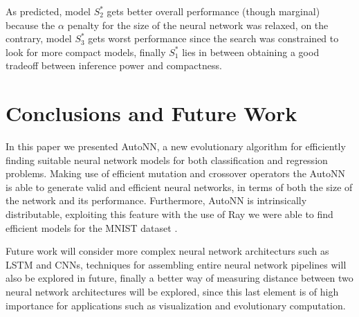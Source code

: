 \documentclass[journal]{IEEEtran}
\begin{document}
As predicted, model $S^*_2$ gets better overall performance (though marginal) because the $\alpha$ penalty for the size of the neural network was relaxed, on the contrary, model $S^*_3$ gets worst performance since the search was constrained to look for more compact models, finally $S^*_1$ lies in between obtaining a good tradeoff between inference power and compactness.

\section{Conclusions and Future Work}
\label{sec:conclusions}

In this paper we presented AutoNN, a new evolutionary algorithm for efficiently finding suitable neural network models for both classification and regression problems. Making use of efficient mutation and crossover operators the AutoNN is able to generate valid and efficient neural networks, in terms of both the size of the network and its performance. Furthermore, AutoNN is intrinsically distributable, exploiting this feature with the use of Ray \cite{Moritz2017} we were able to find efficient models for the MNIST dataset \cite{Lecun2010}.

Future work will consider more complex neural network architecturs such as LSTM and CNNs, techniques for assembling entire neural network pipelines will also be explored in future, finally a better way of measuring distance between two neural network architectures will be explored, since this last element is of high importance for applications such as visualization and evolutionary computation.

\end{document}

